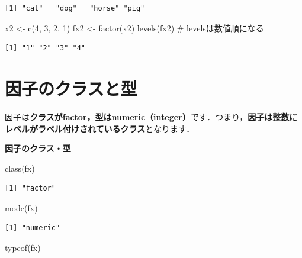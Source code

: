 \documentclass[
  letterpaper,
  DIV=11,
  numbers=noendperiod]{scrreprt}
\newenvironment{Shaded}{\begin{snugshade}}{\end{snugshade}}
\newcommand{\CommentTok}[1]{\textcolor[rgb]{0.37,0.37,0.37}{#1}}
\newcommand{\DecValTok}[1]{\textcolor[rgb]{0.68,0.00,0.00}{#1}}
\newcommand{\FunctionTok}[1]{\textcolor[rgb]{0.28,0.35,0.67}{#1}}
\newcommand{\NormalTok}[1]{\textcolor[rgb]{0.00,0.23,0.31}{#1}}
\newcommand{\OtherTok}[1]{\textcolor[rgb]{0.00,0.23,0.31}{#1}}
\begin{document}
\begin{verbatim}
[1] "cat"   "dog"   "horse" "pig"  
\end{verbatim}

\begin{Shaded}
\begin{Highlighting}[]
\NormalTok{x2 }\OtherTok{\textless{}{-}} \FunctionTok{c}\NormalTok{(}\DecValTok{4}\NormalTok{, }\DecValTok{3}\NormalTok{, }\DecValTok{2}\NormalTok{, }\DecValTok{1}\NormalTok{)}
\NormalTok{fx2 }\OtherTok{\textless{}{-}} \FunctionTok{factor}\NormalTok{(x2)}
\FunctionTok{levels}\NormalTok{(fx2) }\CommentTok{\# levelsは数値順になる}
\end{Highlighting}
\end{Shaded}

\begin{verbatim}
[1] "1" "2" "3" "4"
\end{verbatim}

\hypertarget{ux56e0ux5b50ux306eux30afux30e9ux30b9ux3068ux578b}{%
\section{因子のクラスと型}\label{ux56e0ux5b50ux306eux30afux30e9ux30b9ux3068ux578b}}

因子は\textbf{クラスがfactor，型はnumeric（integer）}です．つまり，\textbf{因子は整数にレベルがラベル付けされているクラス}となります．

\textbf{因子のクラス・型}

\begin{Shaded}
\begin{Highlighting}[]
\FunctionTok{class}\NormalTok{(fx)}
\end{Highlighting}
\end{Shaded}

\begin{verbatim}
[1] "factor"
\end{verbatim}

\begin{Shaded}
\begin{Highlighting}[]
\FunctionTok{mode}\NormalTok{(fx)}
\end{Highlighting}
\end{Shaded}

\begin{verbatim}
[1] "numeric"
\end{verbatim}

\begin{Shaded}
\begin{Highlighting}[]
\FunctionTok{typeof}\NormalTok{(fx)}
\end{Highlighting}
\end{Shaded}
\end{document}
